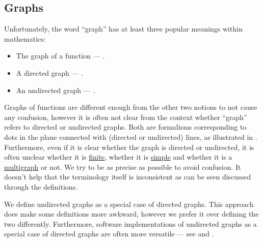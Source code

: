 \subsection{Graphs}\label{subsec:graphs}

\begin{remark}\label{rem:directed_and_undirected_graphs}
  Unfortunately, the word \enquote{graph} has at least three popular meanings within mathematics:
  \begin{itemize}
    \item The graph of a function --- .
    \item A directed graph --- .
    \item An undirected graph --- .
  \end{itemize}

  Graphs of functions are different enough from the other two notions to not cause any confusion, however it is often not clear from the context whether \enquote{graph} refers to directed or undirected graphs. Both are formalisms corresponding to dots in the plane connected with (directed or undirected) lines, as illustrated in . Furthermore, even if it is clear whether the graph is directed or undirected, it is often unclear whether it is \hyperref[def:graph/order]{finite}, whether it is \hyperref[def:graph/simple]{simple} and whether it is a \hyperref[def:multigraph]{multigraph} or not. We try to be as precise as possible to avoid confusion. It doesn't help that the terminology itself is inconsistent as can be seen discussed through the definitions.

  We define undirected graphs as a special case of directed graphs. This approach does make some definitions more awkward, however we prefer it over defining the two differently. Furthermore, software implementations of undirected graphs as a special case of directed graphs are often more versatile --- see \cite[sec. 5.4]{Erickson2019} and \cite[ch. 1, sec. 2.4]{GondranMinoux1984Graphs}.
\end{remark}

